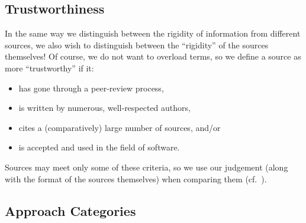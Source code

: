 \subsection{Trustworthiness}\label{trust}

In the same way we distinguish between the rigidity of information from
different sources, we also wish to distinguish between the ``rigidity'' of the
sources themselves! Of course, we do not want to overload terms, so we define a
source as more ``trustworthy'' if it:
\begin{itemize}
    \item has gone through a peer-review process,
    \item is written by numerous, well-respected authors,
    \item cites a (comparatively) large number of sources, and/or
    \item is accepted and used in the field of software.
\end{itemize}
Sources may meet only some of these criteria, so we use our judgement (along
with the format of the sources themselves) when comparing them
(cf.~).

\subsection{Approach Categories}\label{cats-def}

